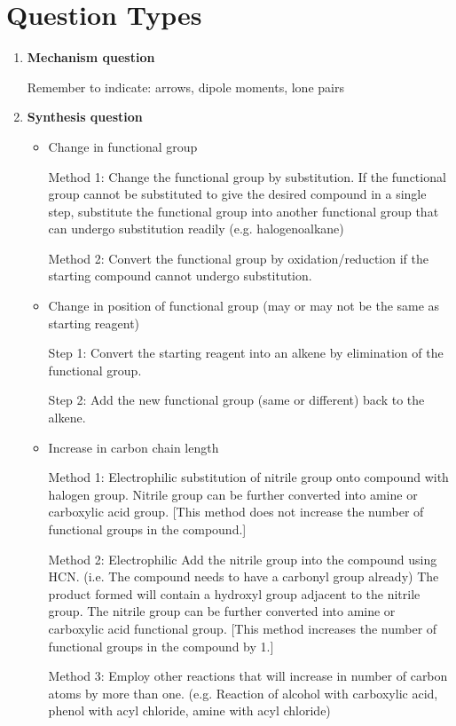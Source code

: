 \documentclass[12pt,a4 paper]{article}
\begin{document}
\section*{Question Types}
\begin{enumerate}
\item \textbf{Mechanism question}

Remember to indicate: arrows, dipole moments, lone pairs

\item \textbf{Synthesis question}
	\begin{itemize}
	\item Change in functional group
	
	Method 1: Change the functional group by substitution. If the functional group cannot be substituted to give the desired compound in a single step, substitute the functional group into another functional group that can undergo substitution readily (e.g.
	halogenoalkane)
	
	Method 2: Convert the functional group by oxidation/reduction if the starting compound cannot undergo substitution.
	
	\item Change in position of functional group (may or may not be the same as starting reagent)
	
	Step 1: Convert the starting reagent into an alkene by elimination of the functional group.
	
	Step 2: Add the new functional group (same or different) back to the alkene.
	
	\item Increase in carbon chain length
	
	Method 1: Electrophilic substitution of nitrile group onto compound with halogen group. Nitrile group can be further converted into amine or carboxylic acid group.
	[This method does not increase the number of functional groups in the compound.]
	
	Method 2: Electrophilic Add the nitrile group into the compound using HCN. (i.e. The compound needs to have a carbonyl group already) The product formed will contain a hydroxyl group adjacent to the nitrile group. The nitrile group can be further converted into amine or carboxylic acid functional group.
	[This method increases the number of functional groups in the compound by 1.]
	
	Method 3: Employ other reactions that will increase in number of carbon atoms by more than one. (e.g. Reaction of alcohol with carboxylic acid, phenol with acyl chloride, amine with acyl chloride)
	

\end{itemize}
\end{enumerate}
\end{document}
